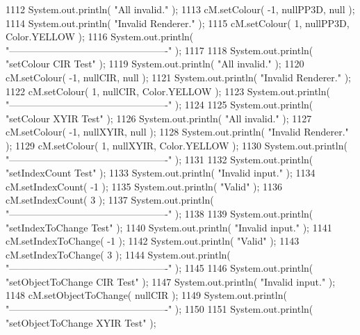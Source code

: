 \begin{DoxyCode}
1112         System.out.println( \textcolor{stringliteral}{"All invalid."} );
1113         cM.setColour( -1, nullPP3D, null );
1114         System.out.println( \textcolor{stringliteral}{"Invalid Renderer."} );
1115         cM.setColour( 1, nullPP3D, Color.YELLOW );
1116         System.out.println( \textcolor{stringliteral}{"-------------------------------------------------"} );
1117         
1118         System.out.println( \textcolor{stringliteral}{"setColour CIR Test"} );
1119         System.out.println( \textcolor{stringliteral}{"All invalid."} );
1120         cM.setColour( -1, nullCIR, null );
1121         System.out.println( \textcolor{stringliteral}{"Invalid Renderer."} );
1122         cM.setColour( 1, nullCIR, Color.YELLOW );
1123         System.out.println( \textcolor{stringliteral}{"-------------------------------------------------"} );
1124         
1125         System.out.println( \textcolor{stringliteral}{"setColour XYIR Test"} );
1126         System.out.println( \textcolor{stringliteral}{"All invalid."} );
1127         cM.setColour( -1, nullXYIR, null );
1128         System.out.println( \textcolor{stringliteral}{"Invalid Renderer."} );
1129         cM.setColour( 1, nullXYIR, Color.YELLOW );
1130         System.out.println( \textcolor{stringliteral}{"-------------------------------------------------"} );
1131         
1132         System.out.println( \textcolor{stringliteral}{"setIndexCount Test"} );
1133         System.out.println( \textcolor{stringliteral}{"Invalid input."} );
1134         cM.setIndexCount( -1 );
1135         System.out.println( \textcolor{stringliteral}{"Valid"} );
1136         cM.setIndexCount( 3 );
1137         System.out.println( \textcolor{stringliteral}{"-------------------------------------------------"} );
1138         
1139         System.out.println( \textcolor{stringliteral}{"setIndexToChange Test"} );
1140         System.out.println( \textcolor{stringliteral}{"Invalid input."} );
1141         cM.setIndexToChange( -1 );
1142         System.out.println( \textcolor{stringliteral}{"Valid"} );
1143         cM.setIndexToChange( 3 );
1144         System.out.println( \textcolor{stringliteral}{"-------------------------------------------------"} );
1145         
1146         System.out.println( \textcolor{stringliteral}{"setObjectToChange CIR Test"} );
1147         System.out.println( \textcolor{stringliteral}{"Invalid input."} );
1148         cM.setObjectToChange( nullCIR );
1149         System.out.println( \textcolor{stringliteral}{"-------------------------------------------------"} );
1150         
1151         System.out.println( \textcolor{stringliteral}{"setObjectToChange XYIR Test"} );

\end{DoxyCode}
